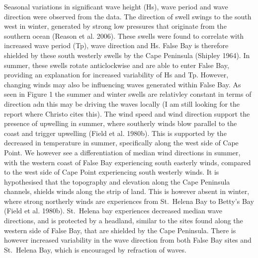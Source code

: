 \documentclass[10pt,a4,]{article}
\begin{document}
Seasonal variations in significant wave height (Hs), wave period and
wave direction were observed from the data. The direction of swell
swings to the south west in winter, generated by strong low pressures
that originate from the southern ocean (Reason et al. 2006). These
swells were found to correlate with increased wave period (Tp), wave
direction and Hs. False Bay is therefore shielded by these south
westerly swells by the Cape Peninsula (Shipley 1964). In summer, these
swells rotate anticlockwise and are able to enter False Bay, providing
an explanation for increased variability of Hs and Tp. However, changing
winds may also be influencing waves generated within False Bay. As seen
in Figure 1 the summer and winter swells are relativley constant in
terms of direction adn this may be driving the waves locally (I am still
looking for the report where Christo cites this). The wind speed and
wind direction support the presence of upwelling in summer, where
southerly winds blow parallel to the coast and trigger upwelling (Field
et al. 1980b). This is supported by the decreased in temperature in
summer, specifically along the west side of Cape Point. We however see a
differentiation of median wind directions in summer, with the western
coast of False Bay experiencing south easterly winds, compared to the
west side of Cape Point experiencing south westerly winds. It is
hypothesised that the topography and elevation along the Cape Peninsula
channels, shields winds along the strip of land. This is however absent
in winter, where strong northerly winds are experiences from St.~Helena
Bay to Betty's Bay (Field et al. 1980b). St.~Helena bay experiences
decreased median wave directions, and is protected by a headland,
similar to the sites found along the western side of False Bay, that are
shielded by the Cape Peninsula. There is however increased variability
in the wave direction from both False Bay sites and St.~Helena Bay,
which is encouraged by refraction of waves.
\end{document}

